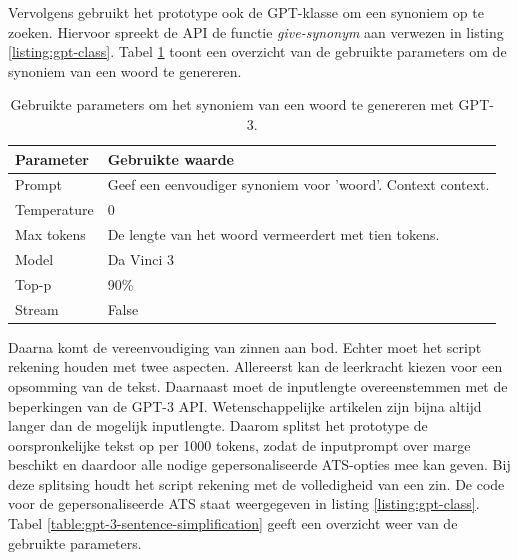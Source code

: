 \medspace

Vervolgens gebruikt het prototype ook de GPT-klasse om een synoniem op te zoeken. Hiervoor spreekt de API de functie \textit{give-synonym} aan verwezen in listing \ref{listing:gpt-class}. Tabel \ref{table:gpt-3-synonym} toont een overzicht van de gebruikte parameters om de synoniem van een woord te genereren.

\begin{center}
	\begin{table}[H]
		\begin{tabular}{| m{5cm}| m{8cm} |}
			\hline
			Parameter & Gebruikte waarde \\ \hline
			Prompt & Geef een eenvoudiger synoniem voor '{woord}'. Context {context}. \\ \hline
			Temperature & 0 \\ \hline
			Max tokens & De lengte van het woord vermeerdert met tien tokens. \\ \hline
			Model & Da Vinci 3 \\ \hline
			Top-p & 90\% \\ \hline
			Stream & False \\ \hline
		\end{tabular}
		\caption{Gebruikte parameters om het synoniem van een woord te genereren met GPT-3.}
		\label{table:gpt-3-synonym}
	\end{table}
\end{center}

\medspace

Daarna komt de vereenvoudiging van zinnen aan bod. Echter moet het script rekening houden met twee aspecten. Allereerst kan de leerkracht kiezen voor een opsomming van de tekst. Daarnaast moet de inputlengte overeenstemmen met de beperkingen van de GPT-3 API. Wetenschappelijke artikelen zijn bijna altijd langer dan de mogelijk inputlengte. Daarom splitst het prototype de oorspronkelijke tekst op per 1000 tokens, zodat de inputprompt over marge beschikt en daardoor alle nodige gepersonaliseerde ATS-opties mee kan geven. Bij deze splitsing houdt het script rekening met de volledigheid van een zin. De code voor de gepersonaliseerde ATS staat weergegeven in listing \ref{listing:gpt-class}. Tabel \ref{table:gpt-3-sentence-simplification} geeft een overzicht weer van de gebruikte parameters.

